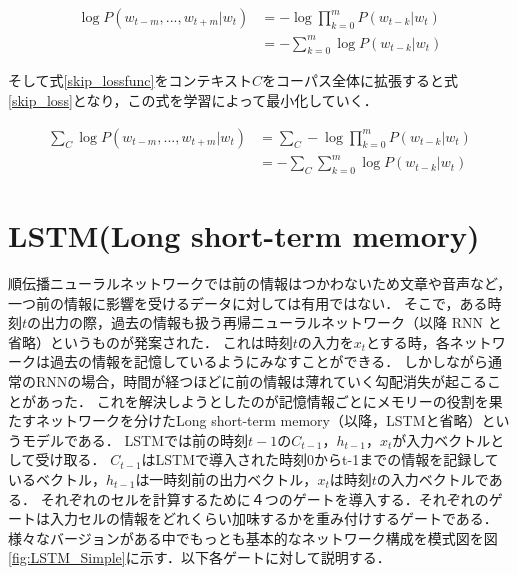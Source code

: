 \documentclass[a4j,11pt,report]{jsbook}
\begin{document}
\begin{equation}
  \label{skip_lossfunc}
  \begin{split}
    \log P(w_{t-m},...,w_{t+m}|w_{t} ) &= -\log \prod_{k = 0}^m P(w_{t-k}|w_{t})   \\
    &= - \sum_{k = 0}^m \log P(w_{t-k} | w_{t})
  \end{split}
\end{equation}

そして式\ref{skip_lossfunc}をコンテキスト$C$をコーパス全体に拡張すると式\ref{skip_loss}となり，この式を学習によって最小化していく．

\begin{equation}
  \label{skip_loss}
  \begin{split}
    \sum_{C} \log P(w_{t-m},...,w_{t+m}|w_{t} ) &= \sum_{C} -\log \prod_{k = 0}^m P(w_{t-k}|w_{t})   \\
    &= - \sum_{C} \sum_{k = 0}^m \log P(w_{t-k} | w_{t})
  \end{split}
\end{equation}


\chapter{LSTM(Long short-term memory)\label{ch:LSTM}}
順伝播ニューラルネットワークでは前の情報はつかわないため文章や音声など，一つ前の情報に影響を受けるデータに対しては有用ではない．
そこで，ある時刻$t$の出力の際，過去の情報も扱う再帰ニューラルネットワーク（以降 RNN と省略）というものが発案された．
これは時刻$t$の入力を$x_{t}$とする時，各ネットワークは過去の情報を記憶しているようにみなすことができる．
しかしながら通常のRNNの場合，時間が経つほどに前の情報は薄れていく勾配消失が起こることがあった．
これを解決しようとしたのが記憶情報ごとにメモリーの役割を果たすネットワークを分けたLong short-term memory（以降，LSTMと省略）というモデルである．
LSTMでは前の時刻$t-1$の$C_{t-1}$，$h_{t-1}$，$x_{t}$が入力ベクトルとして受け取る．
$C_{t-1}$はLSTMで導入された時刻0からt-1までの情報を記録しているベクトル，$h_{t-1}$は一時刻前の出力ベクトル，$x_{t}$は時刻$t$の入力ベクトルである．
それぞれのセルを計算するために４つのゲートを導入する．それぞれのゲートは入力セルの情報をどれくらい加味するかを重み付けするゲートである．
様々なバージョンがある中でもっとも基本的なネットワーク構成を模式図を図\ref{fig:LSTM_Simple}に示す．以下各ゲートに対して説明する．
\end{document}
